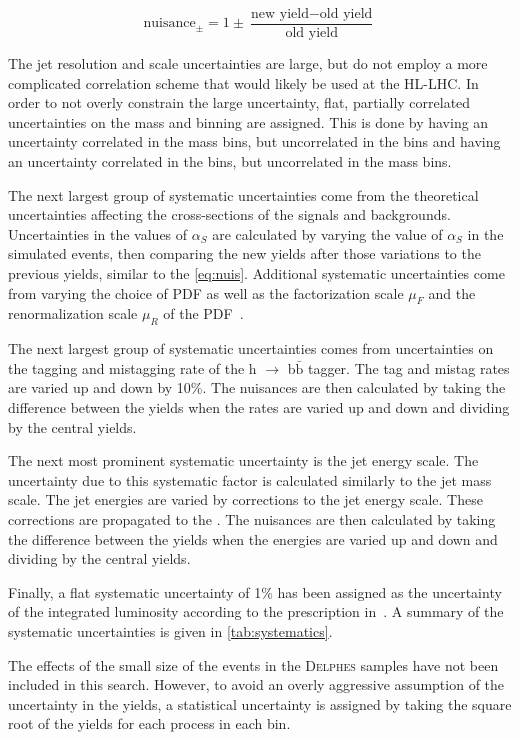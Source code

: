 \begin{equation}
    \text{nuisance}_{\pm} = 1\pm\frac{\text{new yield}-\text{old yield}}{\text{old yield}}
    \label{eq:nuis}
\end{equation}

The jet resolution and scale uncertainties are large, but do not employ a more complicated correlation scheme that would likely be used at the HL-LHC. In order to not overly constrain the large uncertainty, flat, partially correlated uncertainties on the mass and \mt binning are assigned. This is done by having an uncertainty correlated in the mass bins, but uncorrelated in the \mt bins and having an uncertainty correlated in the \mt bins, but uncorrelated in the mass bins.

The next largest group of systematic uncertainties come from the theoretical uncertainties affecting the cross-sections of the signals and backgrounds. Uncertainties in the values of $\alpha_S$ are calculated by varying the value of $\alpha_S$ in the simulated events, then comparing the new yields after those variations to the previous yields, similar to the \cref{eq:nuis}. Additional systematic uncertainties come from varying the choice of PDF as well as the factorization scale $\mu_F$ and the renormalization scale $\mu_R$ of the PDF~\cite{Buckley_2015}.

The next largest group of systematic uncertainties comes from uncertainties on the tagging and mistagging rate of the h $\to$ b$\bar{\mathrm{b}}$ tagger. The tag and mistag rates are varied up and down by 10\%. The nuisances are then calculated by taking the difference between the yields when the rates are varied up and down and dividing by the central yields.

The next most prominent systematic uncertainty is the jet energy scale. The uncertainty due to this systematic factor is calculated similarly to the jet mass scale. The jet energies are varied by corrections to the jet energy scale. These corrections are propagated to the \ptmiss. The nuisances are then calculated by taking the difference between the yields when the energies are varied up and down and dividing by the central yields.

Finally, a flat systematic uncertainty of 1\% has been assigned as the uncertainty of the integrated luminosity according to the prescription in~\cite{CMS-PAS-FTR-16-002}. A summary of the systematic uncertainties is given in \cref{tab:systematics}. 

The effects of the small size of the events in the \textsc{Delphes} samples have not been included in this search. However, to avoid an overly aggressive assumption of the uncertainty in the yields, a statistical uncertainty is assigned by taking the square root of the yields for each process in each bin.

